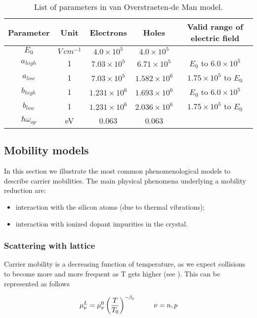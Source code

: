 \begin{table}[!h]
\centering
\begin{tabular}{ccccc}
\toprule
Parameter & Unit & Electrons & Holes  & Valid range of electric field\\
\midrule
$E_0$ & $V \, cm^{-1}$ & $4.0 \times 10^{5}$ & $4.0 \times 10^{5}$ & \\
$a_{high}$ & 1 & $7.03 \times 10^{5}$ & $6.71 \times 10^{5}$ & $E_0$ to $6.0 \times 10^{5}$\\
$a_{low}$ & 1 & $7.03 \times 10^{5}$ & $1.582 \times 10^{6}$ & $1.75 \times 10^{5}$ to $E_0$\\
$b_{high}$ & 1 & $1.231 \times 10^{6}$ & $1.693 \times 10^{6}$ & $E_0$ to $6.0 \times 10^{5}$\\
$b_{low}$ & 1 & $1.231 \times 10^{6}$ & $2.036 \times 10^{6}$ &$1.75 \times 10^{5}$ to $E_0$\\
$\hbar\omega_{op}$ & eV & 0.063 & 0.063\\
\bottomrule
\end{tabular}
\caption{List of parameters in van Overstraeten-de Man model.}
\end{table}



\subsection{Mobility models}

In this section we illustrate the most common phenomenological models to describe carrier mobilities. The main physical phenomena underlying a mobility reduction are:

\begin{itemize}
\item interaction with the silicon atoms (due to thermal vibrations);
\item interaction with ionized dopant impurities in the crystal.
\end{itemize}

\subsubsection{Scattering with lattice}

Carrier mobility is a decreasing function of temperature, as we expect collisions to become more and more frequent as T gets higher (see \cite{Lombardi:MobConst}). This can be represented as follows

\begin{equation}
\label{eq: mobility thermal}
\mu_\nu^L = \mu_\nu^0\left( \dfrac{T}{T_0}\right)^{-\beta_\nu} \psp{15} \nu = n,p
\end{equation}

